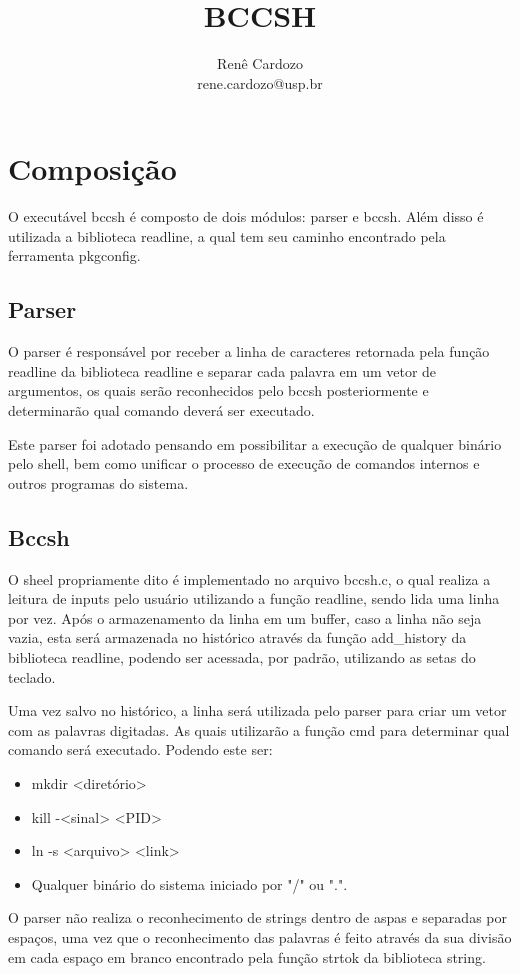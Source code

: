 \documentclass{article}
\author{Renê Cardozo \\ 
        rene.cardozo@usp.br}
\title{BCCSH}
\date{}
\begin{document}
\maketitle

\section{Composição}

O executável bccsh é composto de dois módulos: parser e bccsh. Além disso é utilizada a biblioteca readline, a qual tem
seu caminho encontrado pela ferramenta pkgconfig.

\subsection{Parser}

O parser é responsável por receber a linha de caracteres retornada pela função readline da biblioteca readline e separar
cada palavra em um vetor de argumentos, os quais serão reconhecidos pelo bccsh posteriormente e determinarão qual
comando deverá ser executado.

Este parser foi adotado pensando em possibilitar a execução de qualquer binário pelo shell, bem como unificar o
processo de execução de comandos internos e outros programas do sistema.

\subsection{Bccsh}

O sheel propriamente dito é implementado no arquivo bccsh.c, o qual realiza a leitura de inputs pelo usuário utilizando
a função readline, sendo lida uma linha por vez. Após o armazenamento da linha em um buffer, caso a linha não seja
vazia, esta será armazenada no histórico através da função add\_history da biblioteca readline, podendo ser acessada,
por padrão, utilizando as setas do teclado.

Uma vez salvo no histórico, a linha será utilizada pelo parser para criar um vetor com as palavras digitadas. As quais
utilizarão a função cmd para determinar qual comando será executado. Podendo este ser:

\begin{itemize}
    \item mkdir <diretório>
    \item kill -<sinal> <PID>
    \item ln -s <arquivo> <link>
    \item Qualquer binário do sistema iniciado por "/" ou ".".
\end{itemize}

O parser não realiza o reconhecimento de strings dentro de aspas e separadas por espaços, uma vez que o reconhecimento
das palavras é feito através da sua divisão em cada espaço em branco encontrado pela função strtok da biblioteca
string.
\end{document}
